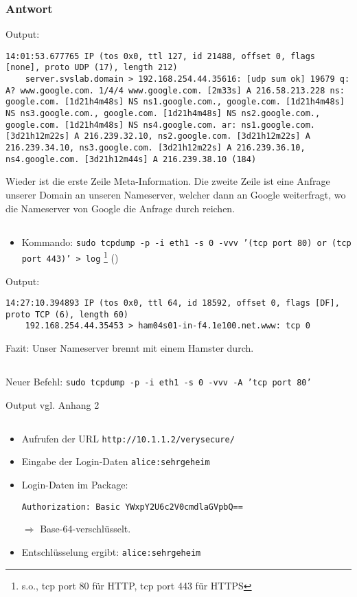 \documentclass[twoside]{article}
\newcommand{\ttt}[1]{%
	\texttt{#1}%
}
\begin{document}
\subsubsection{Antwort}
Output:
\begin{lstlisting}
14:01:53.677765 IP (tos 0x0, ttl 127, id 21488, offset 0, flags [none], proto UDP (17), length 212)
    server.svslab.domain > 192.168.254.44.35616: [udp sum ok] 19679 q: A? www.google.com. 1/4/4 www.google.com. [2m33s] A 216.58.213.228 ns: google.com. [1d21h4m48s] NS ns1.google.com., google.com. [1d21h4m48s] NS ns3.google.com., google.com. [1d21h4m48s] NS ns2.google.com., google.com. [1d21h4m48s] NS ns4.google.com. ar: ns1.google.com. [3d21h12m22s] A 216.239.32.10, ns2.google.com. [3d21h12m22s] A 216.239.34.10, ns3.google.com. [3d21h12m22s] A 216.239.36.10, ns4.google.com. [3d21h12m44s] A 216.239.38.10 (184) 
\end{lstlisting}
Wieder ist die erste Zeile Meta-Information.
Die zweite Zeile ist eine Anfrage unserer Domain an unseren Nameserver, welcher dann an Google weiterfragt, wo die Nameserver von Google die Anfrage durch reichen.
\subsection{}
\begin{itemize}
	\item Kommando: \ttt{sudo tcpdump -p -i eth1 -s 0 -vvv '(tcp port 80) or (tcp port 443)' > log}\footnote{s.o., tcp port 80 für HTTP, tcp port 443 für HTTPS} (\cite{uwtcpdump})
\end{itemize}
Output:
\begin{lstlisting}
14:27:10.394893 IP (tos 0x0, ttl 64, id 18592, offset 0, flags [DF], proto TCP (6), length 60)
    192.168.254.44.35453 > ham04s01-in-f4.1e100.net.www: tcp 0 
\end{lstlisting}
Fazit: Unser Nameserver brennt mit einem Hamster durch.
\subsection{}
Neuer Befehl: \ttt{sudo tcpdump -p -i eth1 -s 0 -vvv -A 'tcp port 80'}
Output vgl. Anhang 2
\subsection{}
\begin{itemize}
	\item Aufrufen der URL \ttt{http://10.1.1.2/verysecure/}
	\item Eingabe der Login-Daten \ttt{alice:sehrgeheim}
	\item Login-Daten im Package:
\begin{lstlisting}
Authorization: Basic YWxpY2U6c2V0cmdlaGVpbQ==
\end{lstlisting}
	$\Rightarrow$ Base-64-verschlüsselt.
	\item Entschlüsselung ergibt: \ttt{alice:sehrgeheim}
\end{itemize}
\end{document}
